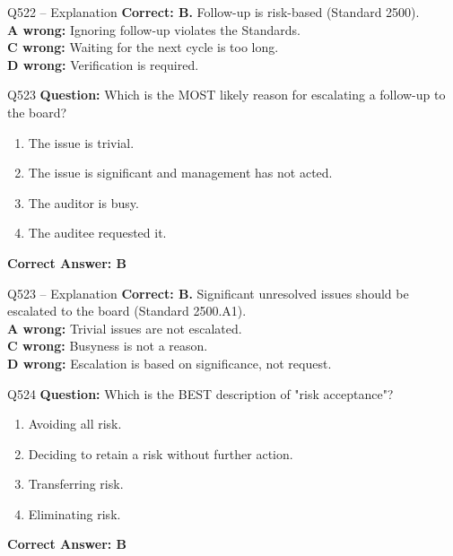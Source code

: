 \documentclass[aspectratio=169,10pt]{beamer}
\begin{document}
	\begin{frame}[t]{Q522 -- Explanation}
		\small
		\textbf{Correct: B.} Follow-up is risk-based (Standard 2500). \\[4pt]
		\textbf{A wrong:} Ignoring follow-up violates the Standards. \\[2pt]
		\textbf{C wrong:} Waiting for the next cycle is too long. \\[2pt]
		\textbf{D wrong:} Verification is required.
	\end{frame}
	
	\begin{frame}[t]{Q523}
		\small
		\textbf{Question:} Which is the MOST likely reason for escalating a follow-up to the board?
		\begin{enumerate}[label=\Alph*.,itemsep=1pt,topsep=2pt]
			\item The issue is trivial.
			\item The issue is significant and management has not acted.
			\item The auditor is busy.
			\item The auditee requested it.
		\end{enumerate}
		\vspace{4pt}
		\textbf{Correct Answer: B}
	\end{frame}
	
	\begin{frame}[t]{Q523 -- Explanation}
		\small
		\textbf{Correct: B.} Significant unresolved issues should be escalated to the board (Standard 2500.A1). \\[4pt]
		\textbf{A wrong:} Trivial issues are not escalated. \\[2pt]
		\textbf{C wrong:} Busyness is not a reason. \\[2pt]
		\textbf{D wrong:} Escalation is based on significance, not request.
	\end{frame}
	
	\begin{frame}[t]{Q524}
		\small
		\textbf{Question:} Which is the BEST description of "risk acceptance"?
		\begin{enumerate}[label=\Alph*.,itemsep=1pt,topsep=2pt]
			\item Avoiding all risk.
			\item Deciding to retain a risk without further action.
			\item Transferring risk.
			\item Eliminating risk.
		\end{enumerate}
		\vspace{4pt}
		\textbf{Correct Answer: B}
	\end{frame}
	
\end{document}
